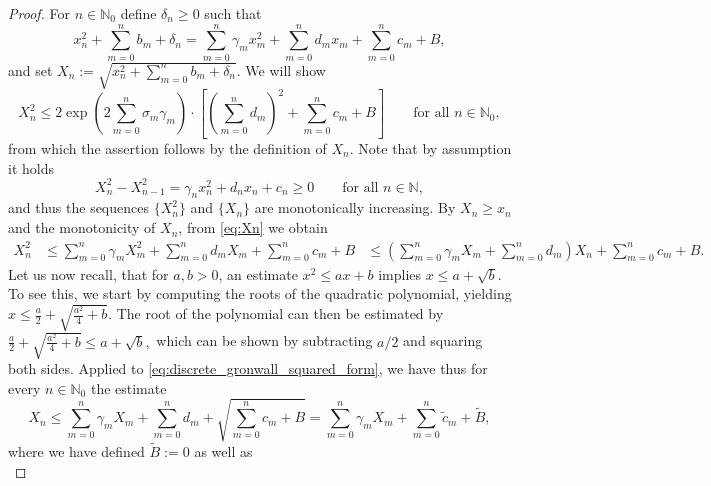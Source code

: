 \documentclass{m2an}
\newcommand{\N}{\mathbb{N}}
\begin{document}
\begin{proof}
  For $n \in \N_0$ define $\delta_n \ge 0$ such that 
  \begin{equation}\label{eq:Xn}
    x_n^2 + \sum_{m=0}^n b_m + \delta_n 
    =\sum_{m=0}^n \gamma_m x_m^2 
    + \sum_{m=0}^n d_m x_m
    + \sum_{m=0}^n c_m + B,
  \end{equation}
  and set $X_n := \sqrt{x_n^2 + \sum_{m=0}^n b_m + \delta_n}$. We will show
  \begin{equation*}
    X_n^2
    \le 2\exp \left(2 \sum_{m=0}^n \sigma_m \gamma_m \right) \cdot
    \left[\left(\sum_{m=0}^n d_m \right)^2 + \sum_{m=0}^n c_m + B\right]
    \qquad \text{for all } n \in \N_0,
  \end{equation*}
  from which the assertion follows by the definition of $X_n$.
  Note that by assumption it holds
  \begin{equation*}
    X_n^2 - X_{n-1}^2 = \gamma_n x_n^2 + d_n x_n + c_n \ge 0
    \qquad \text{for all } n \in \N,
  \end{equation*}
  and thus the sequences $\lbrace X_n^2\rbrace$ and $\lbrace X_n\rbrace$
  are monotonically increasing.
  By $X_n \ge x_n$ and the monotonicity of $X_n$, from \eqref{eq:Xn} we obtain
  \begin{equation}\label{eq:discrete_gronwall_squared_form}
    \begin{aligned}
      X_n^2 &\le \sum_{m=0}^n \gamma_m X_m^2 + \sum_{m=0}^n d_m X_m + \sum_{m=0}^n c_m + B
            &\le \left(\sum_{m=0}^n \gamma_m X_m + \sum_{m=0}^n d_m\right) X_n + \sum_{m=0}^n c_m + B.
    \end{aligned}
  \end{equation}
  Let us now recall, that for $a,b > 0$, an estimate
  $x^2 \le a x + b$ implies $x \le a + \sqrt{b}$.
  To see this, we start by computing the roots of the quadratic polynomial, yielding
  $x \le \frac{a}{2} + \sqrt{ \frac{a^2}{4} +b}$.
  The root of the polynomial can then be estimated by
    $\frac{a}{2} + \sqrt{ \frac{a^2}{4} +b} \le a + \sqrt{b},$
  which can be shown by subtracting $a/2$ and squaring both sides.
  Applied to \cref{eq:discrete_gronwall_squared_form}, we have thus for every $n \in \N_0$ the estimate
  \begin{equation*}
    X_n \le \sum_{m=0}^n \gamma_m X_m + \sum_{m=0}^n d_m + \sqrt{\sum_{m=0}^n c_m + B}
    = \sum_{m=0}^n \gamma_m X_m + \sum_{m=0}^n \tilde c_m + \tilde B,
  \end{equation*}
  where we have defined $\tilde B :=0$ as well as 
  \begin{equation*}

\end{equation*}
\end{proof}
\end{document}
